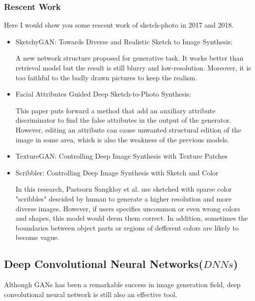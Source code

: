 \documentclass{article}
\begin{document}
\subsubsection{Rescent Work}
\indent Here I would show you some rescent work of sketch-photo in 2017 and 2018.
\begin{itemize}
\item SketchyGAN: Towards Diverse and Realistic Sketch to Image Synthesis\cite{Chen2018SketchyGAN}: \par
A new network structure proposed for generative task. It works better than retrieval model but the result is still blurry and low-resolution. Moreover, it is too faithful to the badly drawn pictures to keep the realism.

\item Facial Attributes Guided Deep Sketch-to-Photo Synthesis\cite{Kazemi2018Facial}: \par
This paper puts forward a method that add an auxiliary attribute discriminator to find the false attributes in the output of the generator. However, editing an attribute can cause unwanted structural edition of the image in some area, which is also the weakness of the previous models.

\item TextureGAN: Controlling Deep Image Synthesis with Texture Patches \cite{Xian2017TextureGAN} \par






\item Scribbler: Controlling Deep Image Synthesis with Sketch and Color\cite{Sangkloy2016Scribbler} \par
In this research, Pastsorn Sangkloy et al. use sketched with sparse color "scribbles" descided by human to generate a higher resolution and more diverse images. However, if users specifies uncommon or even wrong colors and shapes, this model would deem them correct. In addition, sometimes the boundaries between object parts or regions of defferent colors are likely to become vague.




\end{itemize}


\subsection{Deep Convolutional Neural Networks($DNNs$)}
\indent Although GANs has been a remarkable success in image generation field, deep convolutional neural network is still also an effective tool.  




\end{document}
